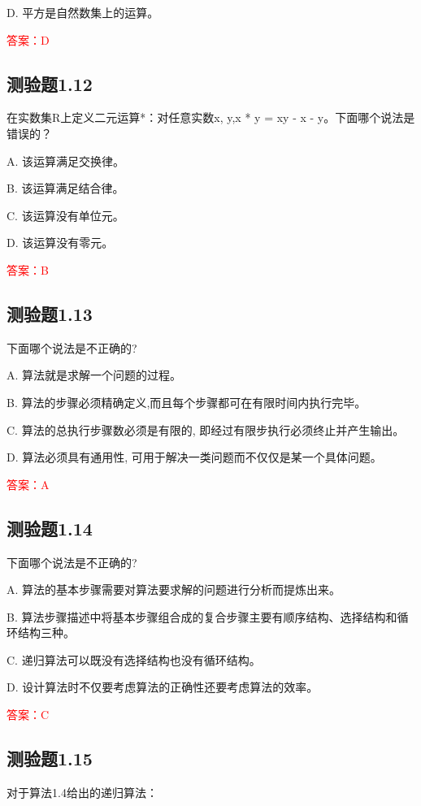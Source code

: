 \documentclass[UTF8, heading=true]{ctexart}
\begin{document}
D. 平方是自然数集上的运算。

\textcolor{red}{答案：D}

\subsection{测验题1.12}

在实数集R上定义二元运算*：对任意实数x, y,x * y = xy - x - y。下面哪个说法是错误的？

A. 该运算满足交换律。

B. 该运算满足结合律。

C. 该运算没有单位元。

D. 该运算没有零元。

\textcolor{red}{答案：B}

\subsection{测验题1.13}

下面哪个说法是不正确的?

A. 算法就是求解一个问题的过程。

B. 算法的步骤必须精确定义,而且每个步骤都可在有限时间内执行完毕。

C. 算法的总执行步骤数必须是有限的, 即经过有限步执行必须终止并产生输出。

D. 算法必须具有通用性, 可用于解决一类问题而不仅仅是某一个具体问题。

\textcolor{red}{答案：A}

\subsection{测验题1.14}

下面哪个说法是不正确的?

A. 算法的基本步骤需要对算法要求解的问题进行分析而提炼出来。

B. 算法步骤描述中将基本步骤组合成的复合步骤主要有顺序结构、选择结构和循环结构三种。

C. 递归算法可以既没有选择结构也没有循环结构。

D. 设计算法时不仅要考虑算法的正确性还要考虑算法的效率。

\textcolor{red}{答案：C}

\subsection{测验题1.15}

对于算法1.4给出的递归算法：
\end{document}
